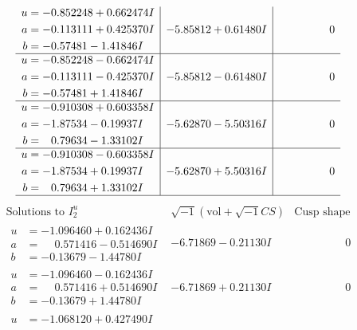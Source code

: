 \documentclass[1p]{elsarticle_modified}
\theoremstyle{definition}
\newcommand{\I}{\sqrt{-1}}
\begin{document}
$$\begin{array}{c|c|c}
\begin{aligned}
u &= -0.852248 + 0.662474 I \\
a &= -0.113111 + 0.425370 I \\
b &= -0.57481 - 1.41846 I\end{aligned}
 & -5.85812 + 0.61480 I & \phantom{-0.000000 } 0 \\ \hline\begin{aligned}
u &= -0.852248 - 0.662474 I \\
a &= -0.113111 - 0.425370 I \\
b &= -0.57481 + 1.41846 I\end{aligned}
 & -5.85812 - 0.61480 I & \phantom{-0.000000 } 0 \\ \hline\begin{aligned}
u &= -0.910308 + 0.603358 I \\
a &= -1.87534 - 0.19937 I \\
b &= \phantom{-}0.79634 - 1.33102 I\end{aligned}
 & -5.62870 - 5.50316 I & \phantom{-0.000000 } 0 \\ \hline\begin{aligned}
u &= -0.910308 - 0.603358 I \\
a &= -1.87534 + 0.19937 I \\
b &= \phantom{-}0.79634 + 1.33102 I\end{aligned}
 & -5.62870 + 5.50316 I & \phantom{-0.000000 } 0\\
 \hline 
 \end{array}$$\newpage$$\begin{array}{c|c|c}  
\text{Solutions to }I^u_{2}& \I (\text{vol} + \sqrt{-1}CS) & \text{Cusp shape}\\
 \hline 
\begin{aligned}
u &= -1.096460 + 0.162436 I \\
a &= \phantom{-}0.571416 - 0.514690 I \\
b &= -0.13679 - 1.44780 I\end{aligned}
 & -6.71869 - 0.21130 I & \phantom{-0.000000 } 0 \\ \hline\begin{aligned}
u &= -1.096460 - 0.162436 I \\
a &= \phantom{-}0.571416 + 0.514690 I \\
b &= -0.13679 + 1.44780 I\end{aligned}
 & -6.71869 + 0.21130 I & \phantom{-0.000000 } 0 \\ \hline\begin{aligned}
u &= -1.068120 + 0.427490 I \\

\end{aligned}
\end{array}$$
\end{document}
